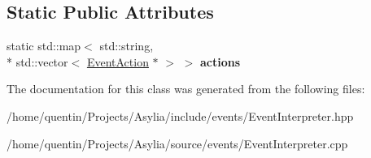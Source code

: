 \subsection*{Static Public Attributes}
\begin{DoxyCompactItemize}
\item 
\hypertarget{classEventInterpreter_a239772986bd5ee2baa7e3ca7b23d07e5}{static std\-::map$<$ std\-::string, \\*
std\-::vector$<$ \hyperlink{classEventAction}{Event\-Action} $\ast$ $>$ $>$ {\bfseries actions}}\label{classEventInterpreter_a239772986bd5ee2baa7e3ca7b23d07e5}

\end{DoxyCompactItemize}


The documentation for this class was generated from the following files\-:\begin{DoxyCompactItemize}
\item 
/home/quentin/\-Projects/\-Asylia/include/events/Event\-Interpreter.\-hpp\item 
/home/quentin/\-Projects/\-Asylia/source/events/Event\-Interpreter.\-cpp\end{DoxyCompactItemize}
